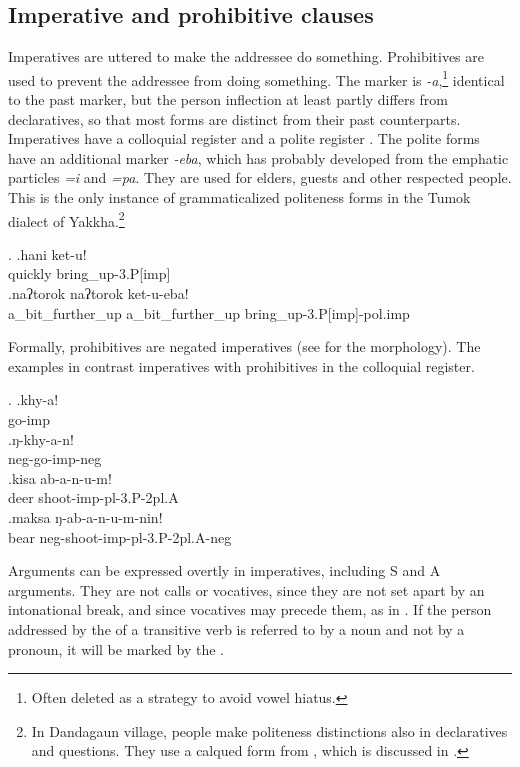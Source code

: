 \subsection{Imperative and prohibitive clauses}

Imperatives are uttered to make the addressee do something. Prohibitives are used to prevent the addressee from doing something. The  marker is \emph{-a},\footnote{Often deleted as a strategy to avoid vowel hiatus.} identical to the past marker, but the person inflection at least partly differs from declaratives, so that most forms are distinct from their past counterparts. Imperatives have a colloquial register \Next[a] and a polite register \Next[b]. The polite forms have an additional marker \emph{-eba}, which has probably developed from the emphatic particles \emph{=i} and \emph{=pa}. They are used for elders, guests and other respected people. This is the only instance of grammaticalized politeness forms in the Tumok dialect of Yakkha.\footnote{In Dandagaun village, people make politeness distinctions also in declaratives and questions. They use a calqued form from , which is discussed in .} 

\ex. \ag.hani ket-u!\\
quickly bring\_up{\sc -3.P[imp]}\\
\bg.naʔtorok naʔtorok ket-u-eba!\\
a\_bit\_further\_up a\_bit\_further\_up  bring\_up{\sc -3.P[imp]-pol.imp}\\

Formally, prohibitives are  negated imperatives (see  for the morphology). The examples in \Next contrast  imperatives with prohibitives in the colloquial register.

\ex. \ag.khy-a!\\
go{\sc -imp}\\
\bg.ŋ-khy-a-n!\\
{\sc neg-}go{\sc -imp-neg}\\
\bg.kisa ab-a-n-u-m!\\
deer shoot{\sc -imp-pl-3.P-2pl.A}\\
\bg.maksa ŋ-ab-a-n-u-m-nin!\\
bear {\sc neg-}shoot{\sc -imp-pl-3.P-2pl.A-neg}\\

Arguments can be expressed overtly in imperatives, including S and A arguments. They are not calls or vocatives, since they are not set apart by an intonational break, and since vocatives may precede them, as in \Next[a]. If the person addressed by the  of a transitive verb is referred to by a noun and not by a pronoun, it will be marked by the .

